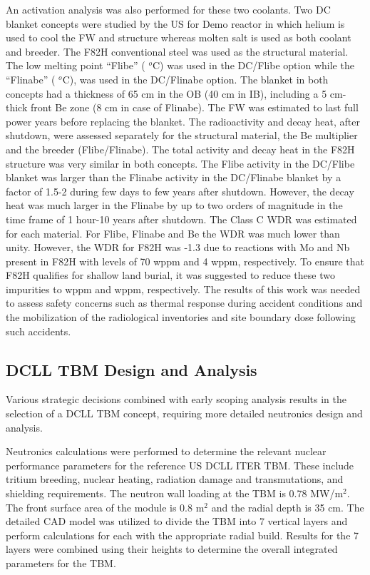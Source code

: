 An activation analysis was also performed for these two coolants.  Two
\gls{DC} blanket concepts were studied by the US for Demo reactor in which
helium is used to cool the \gls{FW} and structure whereas molten salt is used
as both coolant and breeder. The F82H conventional steel was used as the
structural material. The low melting point “Flibe” ( $^o$C) was
used in the DC/Flibe option while the “Flinabe” ( $^o$C), was
used in the DC/Flinabe option. The blanket in both concepts had a thickness of
65 cm in the \gls{OB} (40 cm in \gls{IB}), including a 5 cm-thick front Be
zone (8 cm in case of Flinabe). The \gls{FW} was estimated to last  full power years before replacing the blanket. The radioactivity and decay
heat, after shutdown, were assessed separately for the structural material,
the Be multiplier and the breeder (Flibe/Flinabe). The total activity and
decay heat in the F82H structure was very similar in both concepts. The Flibe
activity in the DC/Flibe blanket was larger than the Flinabe activity in the
DC/Flinabe blanket by a factor of 1.5-2 during few days to few years after
shutdown.  However, the decay heat was much larger in the Flinabe by up to two
orders of magnitude in the time frame of 1 hour-10 years after shutdown. The
Class C \gls{WDR} was estimated for each material. For Flibe, Flinabe and Be
the \gls{WDR} was much lower than unity.  However, the \gls{WDR} for F82H was
-1.3 due to reactions with Mo and Nb present in F82H with
levels of 70 wppm and 4 wppm, respectively. To ensure that F82H qualifies for
shallow land burial, it was suggested to reduce these two impurities to
 wppm and  wppm, respectively. The results of this
work was needed to assess safety concerns such as thermal response during
accident conditions and the mobilization of the radiological inventories and
site boundary dose following such accidents.

\subsection{\acrfull{DCLL} \acrfull{TBM} Design and Analysis}

Various strategic decisions combined with early scoping analysis results in
the selection of a \gls{DCLL} \gls{TBM} concept, requiring more detailed
neutronics design and analysis.


Neutronics calculations were performed to determine the relevant nuclear
performance parameters for the reference US \gls{DCLL} ITER \gls{TBM}. These
include tritium breeding, nuclear heating, radiation damage and
transmutations, and shielding requirements. The neutron wall loading at the
\gls{TBM} is 0.78 MW/m$^2$. The front surface area of the module is 0.8 m$^2$
and the radial depth is 35 cm. The detailed \gls{CAD} model was utilized to
divide the \gls{TBM} into 7 vertical layers and perform calculations for each
with the appropriate radial build. Results for the 7 layers were combined
using their heights to determine the overall integrated parameters for the
\gls{TBM}.

